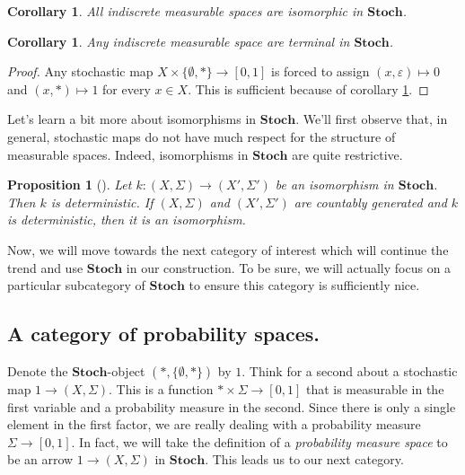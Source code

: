 \documentclass[11pt]{amsart}
\renewcommand{\epsilon}{\varepsilon}
\newcommand{\cat}[1]{\mathbf{#1}}
\newcommand{\from}{\colon}
\newtheorem{prop}[thm]{Proposition}
\newtheorem{cor}[thm]{Corollary}
\theoremstyle{remark}
\theoremstyle{definition}
\begin{document}
\begin{cor} \label{cor.indiscrete m spaces all isom}
	All indiscrete measurable spaces are isomorphic in $\cat{Stoch}$.  
\end{cor}

\begin{cor}
	Any indiscrete measurable space are terminal in $\cat{Stoch}$.
\end{cor}
\begin{proof}
	 Any stochastic map $X \times 
	 \{\emptyset,\ast\} \to [0,1]$ is forced 
	 to assign $(x,\epsilon) \mapsto 0$ and 
	 $(x,\ast) \mapsto 1$ for every $x \in X$. 
	 This is sufficient because of corollary 
	 \ref{cor.indiscrete m spaces all isom}.
\end{proof}

Let's learn a bit more about isomorphisms in 
$\cat{Stoch}$.  We'll first observe that, in 
general, stochastic maps do not have much 
respect for the structure of measurable 
spaces. Indeed, isomorphisms in $\cat{Stoch}$ 
are quite restrictive. 

\begin{prop}[{\cite[Props. 2.16 \& 2.17]{Fong_CatBayesianNetworks}}]
	Let $k \from (X,\Sigma) \to (X',\Sigma')$ be an isomorphism in $\cat{Stoch}$.  Then $k$ is deterministic. If $(X,\Sigma)$ and $(X',\Sigma')$ are countably generated and $k$ is deterministic, then it is an isomorphism.
\end{prop}



Now, we will move towards the next category of interest which will continue the trend and use $\cat{Stoch}$ in our construction. To be sure, we will actually focus on a particular subcategory of $\cat{Stoch}$ to ensure this category is sufficiently nice.  

\subsection{A category of probability spaces.}

Denote the $\cat{Stoch}$-object $(\ast,\{\emptyset,\ast\})$ by $1$. Think for a second about a stochastic map $1 \to (X,\Sigma)$.  This is a function $\ast \times \Sigma \to [0,1]$ that is measurable in the first variable and a probability measure in the second.  Since there is only a single element in the first factor, we are really dealing with a probability measure $\Sigma \to [0,1]$.  In fact, we will take the definition of a \textit{probability measure space} to be an arrow $1 \to (X,\Sigma)$ in $\cat{Stoch}$. This leads us to our next category.
\end{document}
